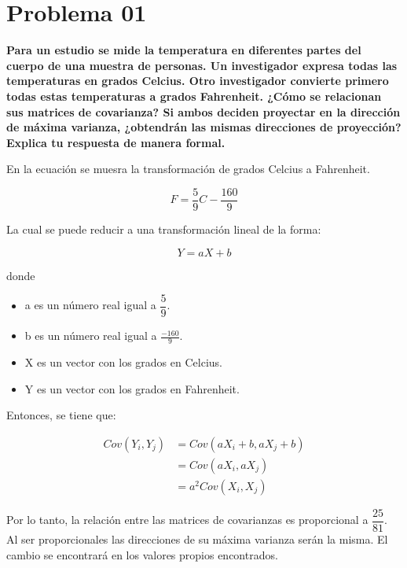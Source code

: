 \section*{Problema 01}

\textbf{Para un estudio se mide la temperatura en diferentes partes del cuerpo de una muestra de personas. Un investigador expresa todas las temperaturas en grados Celcius. Otro investigador convierte primero todas estas temperaturas a grados Fahrenheit. ¿Cómo se relacionan sus matrices de covarianza? Si ambos deciden proyectar en la dirección de máxima varianza, ¿obtendrán las mismas direcciones de proyección? Explica tu respuesta de manera formal.}

En la ecuación se muesra la transformación de grados Celcius a Fahrenheit.

\begin{equation}
    F = \frac{5}{9} C - \frac{160}{9}
\end{equation}

La cual se puede reducir a una transformación lineal de la forma:

\begin{equation*}
    Y = a X + b
\end{equation*}

donde \begin{itemize}
    \item a es un número real igual a $\dfrac{5}{9}$.
    \item b es un número real igual a $\frac{-160}{9}$.
    \item X es un vector con los grados en Celcius.
    \item Y es un vector con los grados en Fahrenheit.
\end{itemize}

Entonces, se tiene que:

\begin{align*}
    Cov(Y_i,Y_j) & = Cov(aX_i+b,aX_j+b) \\
                 & = Cov(aX_i,aX_j)     \\
                 & = a^2 Cov(X_i,X_j)
\end{align*}

Por lo tanto, la relación entre las matrices de covarianzas es proporcional a $\dfrac{25}{81}$. Al ser proporcionales las direcciones de su máxima varianza serán la misma. El cambio se encontrará en los valores propios encontrados.